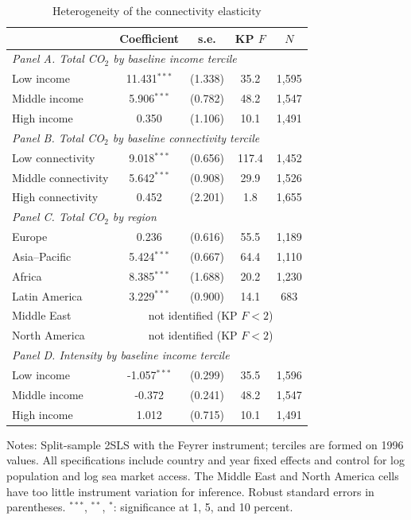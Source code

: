 \documentclass[12pt]{article}
\begin{document}
\begin{table}[htbp]
\centering
\begin{threeparttable}
\caption{Heterogeneity of the connectivity elasticity}
\label{tab:hetero}
\footnotesize
\begin{tabular}{lcccc}
\toprule
 & Coefficient & s.e. & KP $F$ & $N$ \\
\midrule
\multicolumn{5}{l}{\textit{Panel A. Total CO$_2$ by baseline income tercile}} \\
  Low income & 11.431$^{***}$ & (1.338) & 35.2 & 1,595 \\
  Middle income & 5.906$^{***}$ & (0.782) & 48.2 & 1,547 \\
  High income & 0.350 & (1.106) & 10.1 & 1,491 \\
\midrule
\multicolumn{5}{l}{\textit{Panel B. Total CO$_2$ by baseline connectivity tercile}} \\
  Low connectivity & 9.018$^{***}$ & (0.656) & 117.4 & 1,452 \\
  Middle connectivity & 5.642$^{***}$ & (0.908) & 29.9 & 1,526 \\
  High connectivity & 0.452 & (2.201) & 1.8 & 1,655 \\
\midrule
\multicolumn{5}{l}{\textit{Panel C. Total CO$_2$ by region}} \\
  Europe & 0.236 & (0.616) & 55.5 & 1,189 \\
  Asia--Pacific & 5.424$^{***}$ & (0.667) & 64.4 & 1,110 \\
  Africa & 8.385$^{***}$ & (1.688) & 20.2 & 1,230 \\
  Latin America & 3.229$^{***}$ & (0.900) & 14.1 & 683 \\
  Middle East & \multicolumn{4}{c}{not identified (KP $F<2$)} \\
  North America & \multicolumn{4}{c}{not identified (KP $F<2$)} \\
\midrule
\multicolumn{5}{l}{\textit{Panel D. Intensity by baseline income tercile}} \\
  Low income & -1.057$^{***}$ & (0.299) & 35.5 & 1,596 \\
  Middle income & -0.372 & (0.241) & 48.2 & 1,547 \\
  High income & 1.012 & (0.715) & 10.1 & 1,491 \\
\bottomrule
\end{tabular}
\begin{tablenotes}[flushleft]
\footnotesize
\item Notes: Split-sample 2SLS with the Feyrer instrument; terciles are formed on 1996 values. All specifications include country and year fixed effects and control for log population and log sea market access. The Middle East and North America cells have too little instrument variation for inference. Robust standard errors in parentheses. $^{***}$, $^{**}$, $^{*}$: significance at 1, 5, and 10 percent.
\end{tablenotes}
\end{threeparttable}
\end{table}
\end{document}
